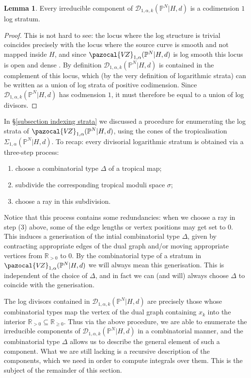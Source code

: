 \documentclass[11pt]{amsart}
\newcommand{\PP}{\mathbb P}
\newcommand{\VZ}{\pazocal{V\!Z}}
\newcommand{\Dcal}{\mathcal{D}}
\newcommand{\RR}{\mathbb{R}}
\theoremstyle{definition}
\newtheorem{lemma}[thm]{Lemma}
\theoremstyle{definition}
\begin{document}
\begin{lemma} \label{Lemma components are log divisors} Every irreducible component of $\Dcal_{1,\alpha,k}(\PP^N|H,d)$ is a codimension $1$ log stratum.\end{lemma}
\begin{proof} This is not hard to see: the locus where the log structure is trivial coincides precisely with the  locus where the source curve is smooth and not mapped inside $H$, and since $\VZ_{1,\alpha}(\PP^N|H,d)$ is log smooth this locus is open and dense \cite{Niziol}. By definition $\Dcal_{1,\alpha,k}(\PP^N|H,d)$ is contained in the  complement of this locus, which (by the very definition of logarithmic strata) can be written as a union of log strata of positive codimension. Since $\Dcal_{1,\alpha,k}(\PP^N|H,d)$ has codmension $1$, it must therefore be equal to a union of log divisors.\end{proof}
In \S \ref{subsection indexing strata} we discussed a procedure for enumerating the log strata of $\VZ_{1,\alpha}(\PP^N|H,d)$, using the cones of the tropicalisation $\Sigma_{1,\alpha}(\PP^N|H,d)$. To recap: every divisorial logarithmic stratum is obtained via a three-step process:
\begin{enumerate}
\item choose a combinatorial type $\Delta$ of a tropical map;
\item subdivide the corresponding tropical moduli space $\sigma$;
\item choose a ray in this subdivision.
\end{enumerate}
Notice that this process contains some redundancies: when we choose a ray in step (3) above, some of the edge lengths or vertex positions may get set to $0$. This induces a generisation of the intial combinatorial type $\Delta$, given by contracting appropriate edges of the dual graph and/or moving appropriate vertices from $\RR_{>0}$ to $0$. By the combinatorial type of a stratum in $\VZ_{1,\alpha}(\PP^N|H,d)$ we will always mean this generisation. This is independent of the choice of $\Delta$, and in fact we can (and will) always choose $\Delta$ to coincide with the generisation.

The log divisors contained in $\Dcal_{1,\alpha,k}(\PP^N|H,d)$ are precisely those whose  combinatorial types map the vertex of the dual graph containing $x_k$  into the interior $\RR_{>0} \subseteq \RR_{\geq 0}$. Thus via the above procedure, we are able to enumerate the irreducible components of $\Dcal_{1,\alpha,k}(\PP^N|H,d)$ in a combinatorial manner, and the combinatorial type $\Delta$ allows us to describe the general element of such a component. What we are still lacking is a recursive description of the components, which we need in order to compute integrals over them. This is the subject of the remainder of this section.
\end{document}
